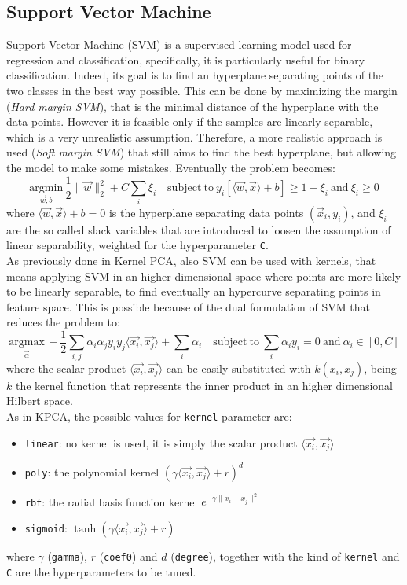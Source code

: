 \documentclass[letterpaper]{article}
\begin{document}
	\subsection{Support Vector Machine}
	Support Vector Machine (SVM) is a supervised learning model used for regression and classification, specifically, it is particularly useful for binary classification. Indeed, its goal is to find an hyperplane separating points of the two classes in the best way possible. This can be done by maximizing the margin (\emph{Hard margin SVM}), that is the minimal distance of the hyperplane with the data points. However it is feasible only if the samples are linearly separable, which is a very unrealistic assumption. Therefore, a more realistic approach is used (\emph{Soft margin SVM}) that still aims to find the best hyperplane, but allowing the model to make some mistakes. Eventually the problem becomes:
	\begin{equation}
		\underset{\vec{w}, b}{\mathrm{argmin}}\, \frac{1}{2}\lVert\vec{w}\rVert_2^2 + C\sum_{i}\xi_i \quad \mathrm{subject\ to\ }y_i[\langle \vec{w},\vec{x}\rangle+b]\ge1-\xi_i \mathrm{\ and\ } \xi_i\ge0
	\end{equation}
	where $\langle\vec{w},\vec{x}\rangle+b = 0$ is the hyperplane separating data points $(\vec{x}_i,y_i)$, and $\xi_i$ are the so called slack variables that are introduced to loosen the assumption of linear separability, weighted for the hyperparameter \texttt{C}.\\
	As previously done in Kernel PCA, also SVM can be used with kernels, that means applying SVM in an higher dimensional space where points are more likely to be linearly separable, to find eventually an hypercurve separating points in feature space. This is possible because of the dual formulation of SVM that reduces the problem to:
	\begin{equation}
		\underset{\vec{\alpha}}{\mathrm{argmax}}\, -\frac{1}{2}\sum_{i,j}\alpha_i\alpha_jy_iy_j\langle\vec{x_i},\vec{x_j}\rangle + \sum_{i}\alpha_i \quad \mathrm{subject\ to\ } \sum_{i}\alpha_iy_i=0 \mathrm{\ and\ } \alpha_i\in[0,C]
	\end{equation}
	where the scalar product $\langle\vec{x_i},\vec{x_j}\rangle$ can be easily substituted with $k(x_i,x_j)$, being $k$ the kernel function that represents the inner product in an higher dimensional Hilbert space. \\
	As in KPCA, the possible values for \texttt{kernel} parameter are:
	\begin{itemize}
		\item \texttt{linear}: no kernel is used, it is simply the scalar product $\langle\vec{x_i},\vec{x_j}\rangle$
		\item \texttt{poly}: the polynomial kernel $(\gamma\langle\vec{x_i},\vec{x_j}\rangle+r)^d$
		\item \texttt{rbf}: the radial basis function kernel $e^{-\gamma\lVert x_i+x_j\rVert^2}$
		\item \texttt{sigmoid}: $\tanh(\gamma\langle\vec{x_i},\vec{x_j}\rangle+r)$
	\end{itemize}
	where $\gamma$ (\texttt{gamma}), $r$ (\texttt{coef0}) and $d$ (\texttt{degree}), together with the kind of \texttt{kernel} and \texttt{C} are the hyperparameters to be tuned.
	
\end{document}
